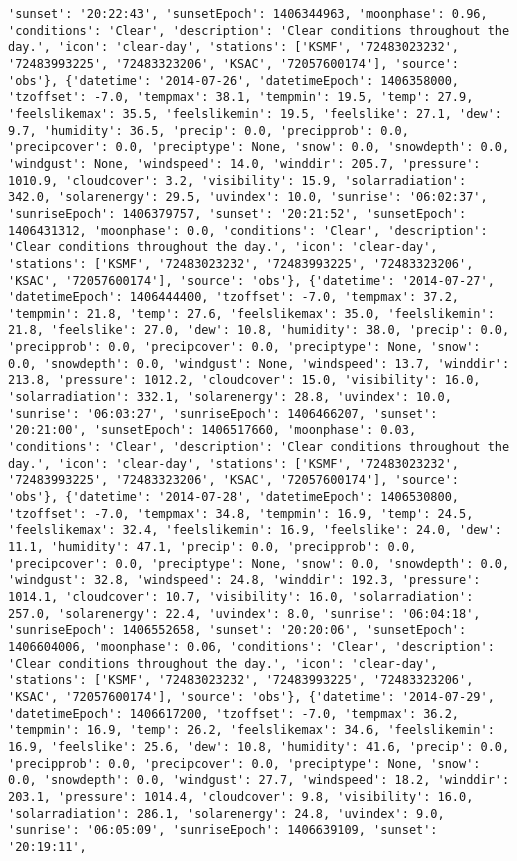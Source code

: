 \documentclass[
  letterpaper,
  DIV=11,
  numbers=noendperiod]{scrartcl}
\begin{document}
\begin{verbatim}
'sunset': '20:22:43', 'sunsetEpoch': 1406344963, 'moonphase': 0.96, 'conditions': 'Clear', 'description': 'Clear conditions throughout the day.', 'icon': 'clear-day', 'stations': ['KSMF', '72483023232', '72483993225', '72483323206', 'KSAC', '72057600174'], 'source': 'obs'}, {'datetime': '2014-07-26', 'datetimeEpoch': 1406358000, 'tzoffset': -7.0, 'tempmax': 38.1, 'tempmin': 19.5, 'temp': 27.9, 'feelslikemax': 35.5, 'feelslikemin': 19.5, 'feelslike': 27.1, 'dew': 9.7, 'humidity': 36.5, 'precip': 0.0, 'precipprob': 0.0, 'precipcover': 0.0, 'preciptype': None, 'snow': 0.0, 'snowdepth': 0.0, 'windgust': None, 'windspeed': 14.0, 'winddir': 205.7, 'pressure': 1010.9, 'cloudcover': 3.2, 'visibility': 15.9, 'solarradiation': 342.0, 'solarenergy': 29.5, 'uvindex': 10.0, 'sunrise': '06:02:37', 'sunriseEpoch': 1406379757, 'sunset': '20:21:52', 'sunsetEpoch': 1406431312, 'moonphase': 0.0, 'conditions': 'Clear', 'description': 'Clear conditions throughout the day.', 'icon': 'clear-day', 'stations': ['KSMF', '72483023232', '72483993225', '72483323206', 'KSAC', '72057600174'], 'source': 'obs'}, {'datetime': '2014-07-27', 'datetimeEpoch': 1406444400, 'tzoffset': -7.0, 'tempmax': 37.2, 'tempmin': 21.8, 'temp': 27.6, 'feelslikemax': 35.0, 'feelslikemin': 21.8, 'feelslike': 27.0, 'dew': 10.8, 'humidity': 38.0, 'precip': 0.0, 'precipprob': 0.0, 'precipcover': 0.0, 'preciptype': None, 'snow': 0.0, 'snowdepth': 0.0, 'windgust': None, 'windspeed': 13.7, 'winddir': 213.8, 'pressure': 1012.2, 'cloudcover': 15.0, 'visibility': 16.0, 'solarradiation': 332.1, 'solarenergy': 28.8, 'uvindex': 10.0, 'sunrise': '06:03:27', 'sunriseEpoch': 1406466207, 'sunset': '20:21:00', 'sunsetEpoch': 1406517660, 'moonphase': 0.03, 'conditions': 'Clear', 'description': 'Clear conditions throughout the day.', 'icon': 'clear-day', 'stations': ['KSMF', '72483023232', '72483993225', '72483323206', 'KSAC', '72057600174'], 'source': 'obs'}, {'datetime': '2014-07-28', 'datetimeEpoch': 1406530800, 'tzoffset': -7.0, 'tempmax': 34.8, 'tempmin': 16.9, 'temp': 24.5, 'feelslikemax': 32.4, 'feelslikemin': 16.9, 'feelslike': 24.0, 'dew': 11.1, 'humidity': 47.1, 'precip': 0.0, 'precipprob': 0.0, 'precipcover': 0.0, 'preciptype': None, 'snow': 0.0, 'snowdepth': 0.0, 'windgust': 32.8, 'windspeed': 24.8, 'winddir': 192.3, 'pressure': 1014.1, 'cloudcover': 10.7, 'visibility': 16.0, 'solarradiation': 257.0, 'solarenergy': 22.4, 'uvindex': 8.0, 'sunrise': '06:04:18', 'sunriseEpoch': 1406552658, 'sunset': '20:20:06', 'sunsetEpoch': 1406604006, 'moonphase': 0.06, 'conditions': 'Clear', 'description': 'Clear conditions throughout the day.', 'icon': 'clear-day', 'stations': ['KSMF', '72483023232', '72483993225', '72483323206', 'KSAC', '72057600174'], 'source': 'obs'}, {'datetime': '2014-07-29', 'datetimeEpoch': 1406617200, 'tzoffset': -7.0, 'tempmax': 36.2, 'tempmin': 16.9, 'temp': 26.2, 'feelslikemax': 34.6, 'feelslikemin': 16.9, 'feelslike': 25.6, 'dew': 10.8, 'humidity': 41.6, 'precip': 0.0, 'precipprob': 0.0, 'precipcover': 0.0, 'preciptype': None, 'snow': 0.0, 'snowdepth': 0.0, 'windgust': 27.7, 'windspeed': 18.2, 'winddir': 203.1, 'pressure': 1014.4, 'cloudcover': 9.8, 'visibility': 16.0, 'solarradiation': 286.1, 'solarenergy': 24.8, 'uvindex': 9.0, 'sunrise': '06:05:09', 'sunriseEpoch': 1406639109, 'sunset': '20:19:11', 
\end{verbatim}
\end{document}
